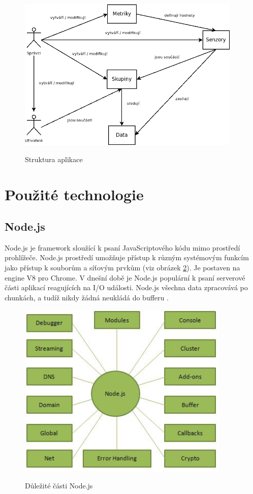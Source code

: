 \documentclass[thesis=M,czech]{FITthesis}[2018/10/20]
\begin{document}
\begin{figure}[h]
\caption{Struktura aplikace}
\centering
\includegraphics[width=0.95\textwidth]{diagrams/users}
\label{fig:users}
\end{figure}
\newpage
\section{Použité technologie}
	\subsection{Node.js}
	Node.js je framework sloužící k psaní JavaScriptového kódu mimo prostředí prohlížeče. Node.js prostředí umožňuje přístup k různým systémovým funkcím jako přístup k souborům a síťovým prvkům (viz obrázek \ref{fig:nodejs}). Je postaven na engine V8 pro Chrome. V dnešní době je Node.js populární k psaní serverové části aplikací reagujících na I/O události. Node.js všechna data zpracovává po chunkách, a tudíž nikdy žádná neukládá do bufferu \cite{nodejs}.

\begin{figure}[h]
\caption{Důležité části Node.js \cite{nodeimg}}
\centering
\includegraphics[width=0.9\textwidth]{nodejs_concepts}
\label{fig:nodejs}
\end{figure}
\end{document}
